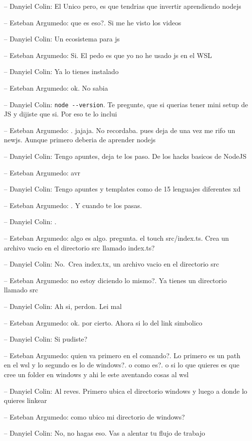 -- Danyiel Colin: El Unico pero, es que tendrias que invertir
aprendiendo nodejs

-- Esteban Argumedo: que es eso?. Si me he visto los videos

-- Danyiel Colin: Un ecosistema para js

-- Esteban Argumedo: Si. El pedo es que yo no he usado js en el WSL

-- Danyiel Colin: Ya lo tienes instalado

-- Esteban Argumedo: ok. No sabia

-- Danyiel Colin: \texttt{node\ -\/-version}. Te pregunte, que si
querias tener mini setup de JS y dijiste que si. Por eso te lo inclui

-- Esteban Argumedo: . jajaja. No recordaba. pues deja de una vez me
rifo un newjs. Aunque primero deberia de aprender nodejs

-- Danyiel Colin: Tengo apuntes, deja te los paso. De los hacks basicos
de NodeJS

-- Esteban Argumedo: avr

-- Danyiel Colin: Tengo apuntes y templates como de 15 lenguajes
diferentes xd

-- Esteban Argumedo: . Y cuando te los pasas.

-- Danyiel Colin: .

-- Esteban Argumedo: algo es algo. pregunta. el touch src/index.ts. Crea
un archivo vacio en el directorio src llamado index.ts?

-- Danyiel Colin: No.~Crea index.tx, un archivo vacio en el directorio
src

-- Esteban Argumedo: no estoy diciendo lo mismo?. Ya tienes un
directorio llamado src

-- Danyiel Colin: Ah si, perdon. Lei mal

-- Esteban Argumedo: ok. por cierto. Ahora si lo del link simbolico

-- Danyiel Colin: Si pudiste?

-- Esteban Argumedo: quien va primero en el comando?. Lo primero es un
path en el wsl y lo segundo es lo de windows?. o como es?. o si lo que
quieres es que cree un folder en windows y ahi le este aventando cosas
al wsl

-- Danyiel Colin: Al reves. Primero ubica el directorio windows y luego
a donde lo quieres linkear

-- Esteban Argumedo: como ubico mi directorio de windows?

-- Danyiel Colin: No, no hagas eso. Vas a alentar tu flujo de trabajo

